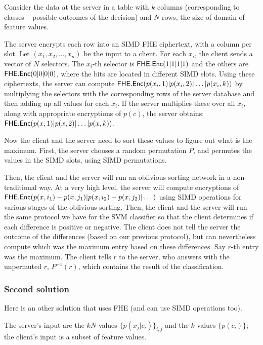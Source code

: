 \documentclass[11pt]{article}
\begin{document}
Consider the data at the server in a table with $k$ columns (corresponding to classes -- possible outcomes of the decision) and $N$ rows, the size of domain of feature values. 

The server encrypts each row into an SIMD FHE ciphertext, with a column per slot. 
Let $(x_1, x_2, \dots, x_n)$ be the input to a client.
For each $x_i$, the client sends a vector of $N$ selectors. The $x_i$-th selector is $\mathsf{FHE.Enc}(1|1|1|1)$ and the others are $\mathsf{FHE.Enc}(0|0|0|0)$, where the bits are located in different SIMD slots. Using these ciphertexts, the server can compute $\mathsf{FHE.Enc}(p(x_i, 1)|p(x_i, 2)| \dots | p(x_i, k))$ by multiplying the selectors with the corresponding rows of the server database and then adding up all values for each $x_i$.  If the server multiplies these over all $x_i$, along with appropriate encryptions of $p(c)$, the server obtains:
 $\mathsf{FHE.Enc}(p(x,1)|p(x, 2)| \dots | p(x, k))$.
 
 Now the client and the server need to sort these values to figure out what is the maximum.
 First, the server chooses a random permutation $P$, and permutes the values in the SIMD slots, using SIMD permutations.
 
 Then, the client and the server will run an oblivious sorting network in a non-traditional way. At a very high level, the server will compute encryptions of $\mathsf{FHE.Enc}(p(x, i_1) - p(x, j_1) | p(x, i_2) - p(x, j_2) | \dots )$ using SIMD operations for various stages of the oblivious sorting. Then, the client and the server will run the same protocol we have for the SVM classifier so that the client determines if each difference is positive or negative.  The client does not tell the server the outcome of the differences (based on our previous protocol), but can nevertheless compute which was the maximum entry based on these differences. Say $r$-th entry was the maximum. The client tells $r$ to the server, who answers with the unpermuted $r$, $P^{-1}(r)$, which contains the result of the classification.
   

\subsubsection{Second solution} %
\label{ssub:bayes_solution_2}
	Here is an other solution that uses FHE (and can use SIMD operations too).
	
	The server's input are the $kN$ values $\{p(x_j|c_i)\}_{i,j}$ and the $k$ values $\{p(c_i)\}$; the client's input is a subset of feature values.
	
\end{document}
